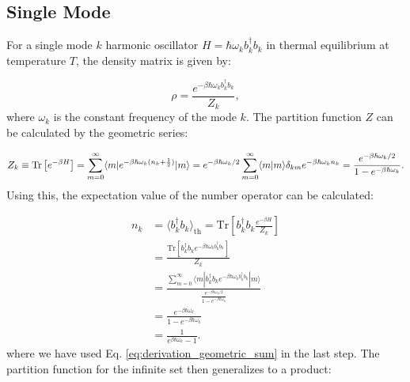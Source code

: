 \subsection{Single Mode}
For a single mode \( k \) harmonic oscillator \( H = \hbar \omega_k b_k^{\dagger} b_k \) in thermal equilibrium at temperature \( T \), the density matrix is given by:

\begin{equation} \label{eq:single_mode_density_matrix}
	\rho = \frac{e^{-\beta \hbar \omega_k b_k^{\dagger} b_k}}{Z_k},
\end{equation}
where \( \omega_k \) is the constant frequency of the mode \( k \).
The partition function \( Z \) can be calculated by the geometric series:

\begin{equation} \label{eq:partition_function}
	Z_k \equiv \mathrm{Tr}\left[e^{-\beta H}\right]
	= \sum_{m=0}^{\infty} \langle m | e^{-\beta \hbar \omega_k (n_k + \frac{1}{2})} | m \rangle
	= e^{-\beta \hbar \omega_k / 2} \sum_{m=0}^{\infty} \langle m | m \rangle \delta_{km} e^{-\beta \hbar \omega_k n_k} \\
	= \frac{e^{-\beta \hbar \omega_k / 2}}{1 - e^{-\beta \hbar \omega_k}}. %
\end{equation}
Using this, the expectation value of the number operator can be calculated:

\begin{align} \label{eq:expectation_number_operator}
	n_k & = \langle b_k^{\dagger} b_k \rangle_{\text{th}} = \mathrm{Tr} \left[ b_k^{\dagger} b_k \frac{e^{-\beta H}}{Z_k} \right]                                                             \\
	    & = \frac{\mathrm{Tr} \left[ b_k^{\dagger} b_k e^{-\beta \hbar \omega_k b_k^{\dagger} b_k} \right]}{Z_k}                                                                              \\
	    & = \frac{\sum_{m=0}^{\infty} \langle m|b_k^{\dagger} b_k e^{-\beta \hbar \omega_k b_k^{\dagger} b_k}|m \rangle}{\frac{e^{-\beta \hbar \omega_k / 2}}{1 - e^{-\beta \hbar \omega_k}}} \\
	    & = \frac{e^{-\beta \hbar \omega_k}}{1 - e^{-\beta \hbar \omega_k}}                                                                                                                   \\
	    & = \frac{1}{e^{\beta \hbar \omega_k} - 1}.
\end{align}
where we have used Eq. \eqref{eq:derivation_geometric_sum} in the last step.
The partition function for the infinite set then generalizes to a product:

